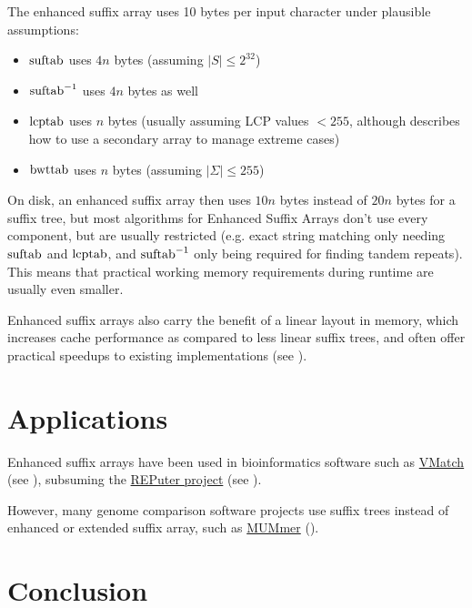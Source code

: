 \documentclass[a4paper,10pt]{article}
\begin{document}
The enhanced suffix array uses 10 bytes per input character under plausible
assumptions:

\begin{itemize}
\item $\hbox{suftab}$ uses $4n$ bytes (assuming $|S| \le 2^32$)
\item $\hbox{suftab}^{-1}$ uses $4n$ bytes as well
\item $\hbox{lcptab}$ uses $n$ bytes (usually assuming LCP values $<255$, although \citealt{abouelhoda2004replacing} describes how to use a secondary array to manage extreme cases)
\item $\hbox{bwttab}$ uses $n$ bytes (assuming $|\Sigma| \le 255$)
\end{itemize}

On disk, an enhanced suffix array then uses $10n$ bytes instead of
$20n$ bytes for a suffix tree, but most algorithms for Enhanced Suffix
Arrays don't use every component, but are usually restricted (e.g. exact
string matching only needing $\hbox{suftab}$ and $\hbox{lcptab}$, and
$\hbox{suftab}^{-1}$ only being required for finding tandem repeats).
This means that practical working memory requirements during runtime
are usually even smaller.

Enhanced suffix arrays also carry the benefit of a linear layout
in memory, which increases cache performance as compared to less
linear suffix trees, and often offer practical speedups to existing
implementations (see \citealt[sec. 7]{abouelhoda2002enhanced}).

\section*{Applications}

Enhanced suffix arrays have been used in bioinformatics
software such as \href{http://vmatch.de/}{VMatch}
(see \citealt{kurtz2003vmatch}), subsuming the
\href{https://bibiserv.cebitec.uni-bielefeld.de/reputer/}{REPuter project}
(see \citealt{kurtz2001reputer}).

However, many genome comparison software projects use
suffix trees instead of enhanced or extended suffix array,
such as \href{http://mummer.sourceforge.net/}{MUMmer}
(\citealt{kurtz2004versatile}).

\section*{Conclusion}



\end{document}

